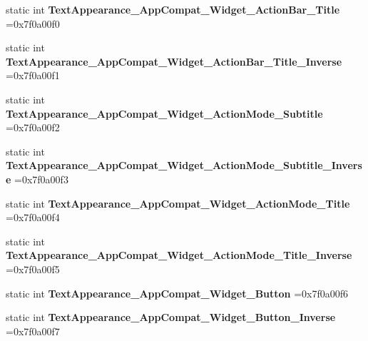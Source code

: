 \begin{DoxyCompactItemize}
static int {\bfseries Text\+Appearance\+\_\+\+App\+Compat\+\_\+\+Widget\+\_\+\+Action\+Bar\+\_\+\+Title} =0x7f0a00f0
\item 
\mbox{\label{classandroid_1_1support_1_1design_1_1R_1_1style_a9145d4c94261b2ae6b6976cd5e23e156}} 
static int {\bfseries Text\+Appearance\+\_\+\+App\+Compat\+\_\+\+Widget\+\_\+\+Action\+Bar\+\_\+\+Title\+\_\+\+Inverse} =0x7f0a00f1
\item 
\mbox{\label{classandroid_1_1support_1_1design_1_1R_1_1style_a0539174eed76349d0bd74acddcf0e804}} 
static int {\bfseries Text\+Appearance\+\_\+\+App\+Compat\+\_\+\+Widget\+\_\+\+Action\+Mode\+\_\+\+Subtitle} =0x7f0a00f2
\item 
\mbox{\label{classandroid_1_1support_1_1design_1_1R_1_1style_a2c00a2db7fce751f3367cd1021b39ed4}} 
static int {\bfseries Text\+Appearance\+\_\+\+App\+Compat\+\_\+\+Widget\+\_\+\+Action\+Mode\+\_\+\+Subtitle\+\_\+\+Inverse} =0x7f0a00f3
\item 
\mbox{\label{classandroid_1_1support_1_1design_1_1R_1_1style_a1d226bd10f67953940744b7a18c80361}} 
static int {\bfseries Text\+Appearance\+\_\+\+App\+Compat\+\_\+\+Widget\+\_\+\+Action\+Mode\+\_\+\+Title} =0x7f0a00f4
\item 
\mbox{\label{classandroid_1_1support_1_1design_1_1R_1_1style_afae4e8d0ffa251cfe844054ff455cb1e}} 
static int {\bfseries Text\+Appearance\+\_\+\+App\+Compat\+\_\+\+Widget\+\_\+\+Action\+Mode\+\_\+\+Title\+\_\+\+Inverse} =0x7f0a00f5
\item 
\mbox{\label{classandroid_1_1support_1_1design_1_1R_1_1style_ac003e5dfa32606c4828254ba9aa4d178}} 
static int {\bfseries Text\+Appearance\+\_\+\+App\+Compat\+\_\+\+Widget\+\_\+\+Button} =0x7f0a00f6
\item 
\mbox{\label{classandroid_1_1support_1_1design_1_1R_1_1style_ae4e95e8777ffdcda2a4cf051beb34823}} 
static int {\bfseries Text\+Appearance\+\_\+\+App\+Compat\+\_\+\+Widget\+\_\+\+Button\+\_\+\+Inverse} =0x7f0a00f7

\end{DoxyCompactItemize}
